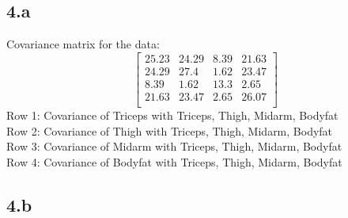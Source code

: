 \documentclass[12pt]{article}
\begin{document}
\subsection*{4.a}
Covariance matrix for the data:
\[\begin{bmatrix}
    25.23 & 24.29 & 8.39 & 21.63 \\
    24.29 & 27.4  & 1.62 & 23.47 \\
    8.39  & 1.62  & 13.3 & 2.65  \\
    21.63 & 23.47 & 2.65 & 26.07 \\
    \end{bmatrix}\]
Row 1: Covariance of Triceps with Triceps, Thigh, Midarm, Bodyfat
\\
Row 2: Covariance of Thigh with Triceps, Thigh, Midarm, Bodyfat
\\
Row 3: Covariance of Midarm with Triceps, Thigh, Midarm, Bodyfat
\\
Row 4: Covariance of Bodyfat with Triceps, Thigh, Midarm, Bodyfat

\newpage
\subsection*{4.b}
\end{document}
